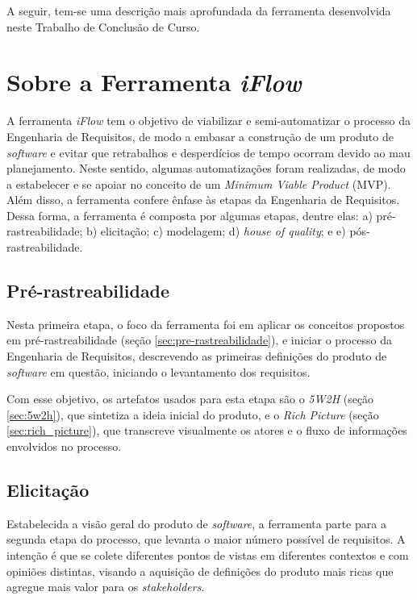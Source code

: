 A seguir, tem-se uma descrição mais aprofundada da ferramenta desenvolvida neste Trabalho de Conclusão de Curso.

\section{Sobre a Ferramenta \textit{iFlow}}

\label{sec:sobre_a_ferramenta}

A ferramenta \textit{iFlow} tem o objetivo de viabilizar e semi-automatizar o processo da Engenharia de Requisitos, de modo a embasar a construção de um produto de \textit{software} e evitar que retrabalhos e desperdícios de tempo ocorram devido ao mau planejamento. Neste sentido, algumas automatizações foram realizadas, de modo a estabelecer e se apoiar no conceito de um \textit{Minimum Viable Product} (MVP). Além disso, a ferramenta confere ênfase às etapas da Engenharia de Requisitos. Dessa forma, a ferramenta é composta por algumas etapas, dentre elas: 
a) pré-rastreabilidade; b) elicitação; c) modelagem; d) \textit{house of quality}; e e) pós-rastreabilidade. 

\subsection{Pré-rastreabilidade}

Nesta primeira etapa, o foco da ferramenta foi em aplicar os conceitos propostos em pré-rastreabilidade (seção \ref{sec:pre-rastreabilidade}), e iniciar o processo da Engenharia de Requisitos, descrevendo as primeiras definições do produto de \textit{software} em questão, iniciando o levantamento dos requisitos.

Com esse objetivo, os artefatos usados para esta etapa são o \textit{5W2H} (seção \ref{sec:5w2h}), que sintetiza a ideia inicial do produto, e o \textit{Rich Picture} (seção \ref{sec:rich_picture}), que transcreve visualmente os atores e o fluxo de informações envolvidos no processo.

\subsection{Elicitação}

\label{sec:proc_elicitacao}

Estabelecida a visão geral do produto de \textit{software}, a ferramenta parte para a segunda etapa do processo, que levanta o maior número possível de requisitos. A intenção é que se colete diferentes pontos de vistas em diferentes contextos e com opiniões distintas, visando a aquisição de definições do produto mais ricas que agregue mais valor para os \textit{stakeholders}.

